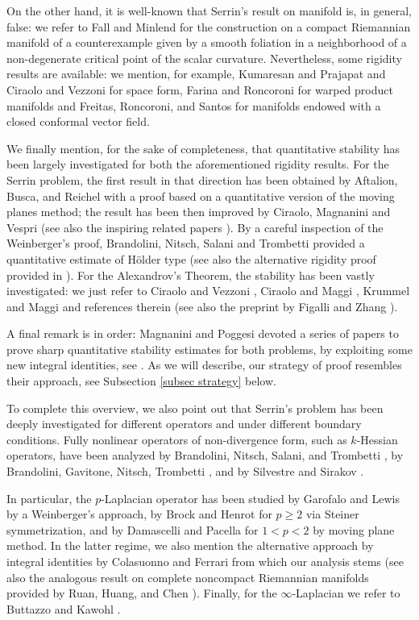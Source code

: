 \documentclass[10pt,a4paper, reqno]{amsart}
\numberwithin{equation}{section}
\begin{document}
On the other hand, it is well-known that Serrin's result on manifold is, in general, false: we refer to Fall and Minlend \cite{fm2015} for the construction on a compact Riemannian manifold of a counterexample given by a smooth foliation in a neighborhood of a non-degenerate critical point of the scalar curvature. Nevertheless, some rigidity results are available: we mention, for example, Kumaresan and Prajapat \cite{kp98} and Ciraolo and Vezzoni \cite{cv2019} for space form, Farina and Roncoroni \cite{fr} for warped product manifolds and Freitas, Roncoroni, and Santos \cite{frs2024} for manifolds endowed with a closed conformal vector field.

We finally mention, for the sake of completeness, that quantitative stability has been largely investigated for both the aforementioned rigidity results. For the Serrin problem, the first result in that direction has been obtained by Aftalion, Busca, and Reichel \cite{abr1999} with a proof based on a quantitative version of the moving planes method; the result has been then improved by Ciraolo, Magnanini and Vespri \cite{cmv} (see also the inspiring related papers \cite{cms2015,cms2016}). By a careful inspection of the Weinberger’s proof, Brandolini, Nitsch, Salani and Trombetti \cite{bnst08} provided a quantitative estimate of H\"older type (see also the alternative rigidity proof provided in \cite{bnst}). For the Alexandrov's Theorem, the stability has been vastly investigated: we just refer to Ciraolo and Vezzoni \cite{cv18}, Ciraolo and Maggi \cite{cm2017}, Krummel and Maggi \cite{km2017} and references therein (see also the preprint by Figalli and Zhang \cite{fz2026pre}).

A final remark is in order: Magnanini and Poggesi devoted a series of papers to prove sharp quantitative stability estimates for both problems, by exploiting some new integral identities, see \cite{mapo19,mp2020,mp23}. As we will describe, our strategy of proof resembles their approach, see Subsection \ref{subsec strategy} below.

To complete this overview, we also point out that Serrin's problem has been deeply investigated for different operators and under different boundary conditions. Fully nonlinear operators of non-divergence form, such as $k$-Hessian operators, have been analyzed by Brandolini, Nitsch, Salani, and Trombetti \cite{bnst}, by Brandolini, Gavitone, Nitsch, Trombetti \cite{bgnt}, and by Silvestre and Sirakov \cite{ss}. 

In particular, the $p$-Laplacian operator has been studied by Garofalo and Lewis \cite{gl} by a Weinberger’s approach, by Brock and Henrot \cite{bh} for $p\geq 2$ via Steiner symmetrization, and by Damascelli and Pacella \cite{dp} for $1< p< 2$ by moving plane method. In the latter regime, we also mention the alternative approach by integral identities by Colasuonno and Ferrari \cite{CoFe20} from which our analysis stems (see also the analogous result on complete noncompact Riemannian manifolds provided by Ruan, Huang, and Chen \cite{RuHuCh24}). Finally, for the $\infty$-Laplacian we refer to Buttazzo and Kawohl \cite{bk2011}. 
\end{document}
